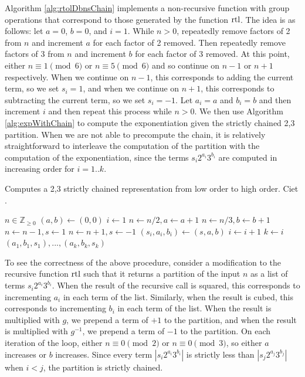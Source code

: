 \documentclass{ucalgthes1}
\theoremstyle{definition}
\newcommand{\ZZgez}{\mathbb{Z}_{\ge 0}}
\begin{document}
Algorithm \ref{alg:rtolDbnsChain} implements a non-recursive function with group operations that correspond to those generated by the function $\textrm{rtl}$.  The idea is as follows: let $a = 0$, $b=0$, and $i=1$.  While $n > 0$, repeatedly remove factors of 2 from $n$ and increment $a$ for each factor of 2 removed. Then repeatedly remove factors of 3 from $n$ and increment $b$ for each factor of 3 removed. At this point, either $n \equiv 1 \pmod 6$ or $n \equiv 5 \pmod 6$ and so continue on $n-1$ or $n+1$ respectively.  When we continue on $n-1$, this corresponds to adding the current term, so we set $s_i=1$, and when we continue on $n+1$, this corresponds to subtracting the current term, so we set $s_i=-1$. Let $a_i = a$ and $b_i = b$ and then increment $i$ and then repeat this process while $n > 0$.  We then use Algorithm \ref{alg:expWithChain} to compute the exponentiation given the strictly chained 2,3 partition. When we are not able to precompute the chain, it is relatively straightforward to interleave the computation of the partition with the computation of the exponentiation, since the terms $s_i2^{a_i}3^{b_i}$ are computed in increasing order for $i=1..k$.

\begin{algorithm}[h]
\caption{Computes a 2,3 strictly chained representation from low order to high order. Ciet \cite{Ciet2006}.}
\label{alg:rtolDbnsChain}
\begin{algorithmic}[1]
\REQUIRE $n \in \ZZgez$
\STATE $(a, b) \gets (0, 0)$
\STATE $i \gets 1$
		\STATE $n \gets n / 2, a \gets a + 1$
	\ENDWHILE
		\STATE $n \gets n / 3, b \gets b + 1$
	\ENDWHILE
		\STATE $n \gets n - 1, s \gets 1$
		\STATE $n \gets n + 1, s \gets -1$
	\ENDIF
	\STATE $(s_i, a_i, b_i) \gets (s, a, b)$
	\STATE $i \gets i + 1$
\ENDWHILE
\STATE $k \gets i$
\RETURN $(a_1, b_1, s_1), ..., (a_k, b_k, s_k)$
\end{algorithmic}
\end{algorithm}

To see the correctness of the above procedure, consider a modification to the recursive function $\textrm{rtl}$ such that it returns a partition of the input $n$ as a list of terms $s_i2^{a_i}3^{b_i}$. When the result of the recursive call is squared, this corresponds to incrementing $a_i$ in each term of the list.  Similarly, when the result is cubed, this corresponds to incrementing $b_i$ in each term of the list. When the result is multiplied with $g$, we prepend a term of $+1$ to the partition, and when the result is multiplied with $g^{-1}$, we prepend a term of $-1$ to the partition. On each iteration of the loop, either $n \equiv 0 \pmod 2$ or $n \equiv 0 \pmod 3$, so either $a$ increases or $b$ increases. Since every term $|s_i2^{a_i}3^{b_i}|$ is strictly less than $|s_j2^{a_j}3^{b_j}|$ when $i < j$, the partition is strictly chained.
\end{document}
